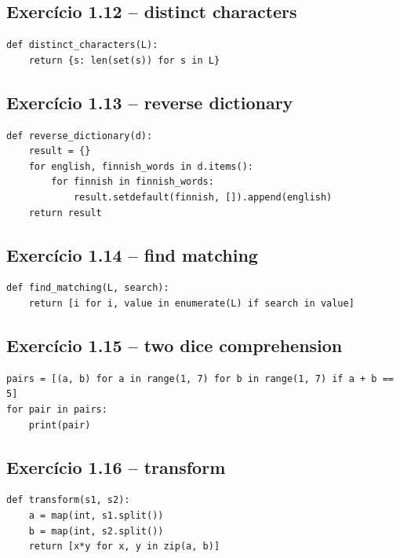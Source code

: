 \documentclass[11pt,a4paper]{article}
\begin{document}
\subsection*{Exercício 1.12 -- distinct characters}
\begin{solucao}
\begin{lstlisting}
def distinct_characters(L):
    return {s: len(set(s)) for s in L}
\end{lstlisting}
\end{solucao}

\subsection*{Exercício 1.13 -- reverse dictionary}
\begin{solucao}
\begin{lstlisting}
def reverse_dictionary(d):
    result = {}
    for english, finnish_words in d.items():
        for finnish in finnish_words:
            result.setdefault(finnish, []).append(english)
    return result
\end{lstlisting}
\end{solucao}

\subsection*{Exercício 1.14 -- find matching}
\begin{solucao}
\begin{lstlisting}
def find_matching(L, search):
    return [i for i, value in enumerate(L) if search in value]
\end{lstlisting}
\end{solucao}

\subsection*{Exercício 1.15 -- two dice comprehension}
\begin{solucao}
\begin{lstlisting}
pairs = [(a, b) for a in range(1, 7) for b in range(1, 7) if a + b == 5]
for pair in pairs:
    print(pair)
\end{lstlisting}
\end{solucao}

\subsection*{Exercício 1.16 -- transform}
\begin{solucao}
\begin{lstlisting}
def transform(s1, s2):
    a = map(int, s1.split())
    b = map(int, s2.split())
    return [x*y for x, y in zip(a, b)]
\end{lstlisting}
\end{solucao}
\end{document}
